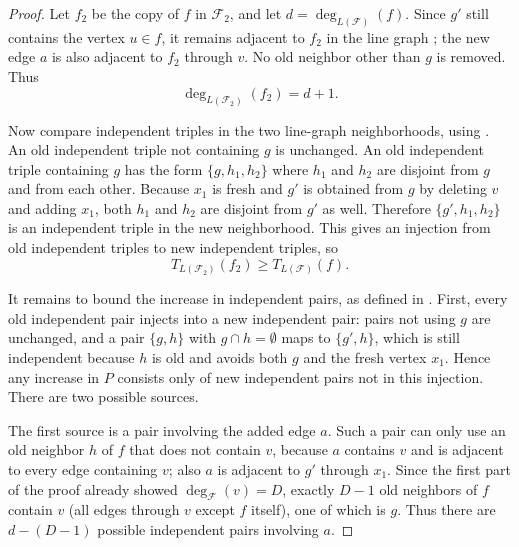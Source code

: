 \begin{proof}
Let $f_2$ be the copy of $f$ in $\mathcal F_2$, and let
$d=\deg_{L(\mathcal F)}(f)$.  Since $g'$ still contains the vertex
$u\in f$, it remains adjacent to $f_2$ in the line graph
; the new edge $a$ is also adjacent to
$f_2$ through $v$.  No old neighbor other than $g$ is removed.  Thus
\[
  \deg_{L(\mathcal F_2)}(f_2)=d+1 .
\]

Now compare independent triples in the two line-graph neighborhoods, using
.  An old independent triple not containing
$g$ is unchanged.  An old independent triple containing $g$ has the form
$\{g,h_1,h_2\}$ where $h_1$ and $h_2$ are disjoint from $g$ and from each
other.  Because $x_1$ is fresh and $g'$ is obtained from $g$ by deleting
$v$ and adding $x_1$, both $h_1$ and $h_2$ are disjoint from $g'$ as well.
Therefore $\{g',h_1,h_2\}$ is an independent triple in the new
neighborhood.  This gives an injection from old independent triples to new
independent triples, so
\[
  T_{L(\mathcal F_2)}(f_2)\ge T_{L(\mathcal F)}(f).
\]

It remains to bound the increase in independent pairs, as defined in
.  First, every old independent pair injects
into a new independent pair: pairs not using $g$ are unchanged, and a pair
$\{g,h\}$ with $g\cap h=\emptyset$ maps to $\{g',h\}$, which is still
independent because $h$ is old and avoids both $g$ and the fresh vertex
$x_1$.  Hence any increase in $P$ consists only of new independent pairs
not in this injection.  There are two possible sources.

The first source is a pair involving the added edge $a$.  Such a pair can
only use an old neighbor $h$ of $f$ that does not contain $v$, because
$a$ contains $v$ and is adjacent to every edge containing $v$; also $a$ is
adjacent to $g'$ through $x_1$.  Since the first part of the proof already
showed $\deg_{\mathcal F}(v)=D$, exactly $D-1$ old neighbors of $f$ contain
$v$ (all edges through $v$ except $f$ itself), one of which is $g$.  Thus
there are $d-(D-1)$ possible independent pairs involving $a$.


\end{proof}
